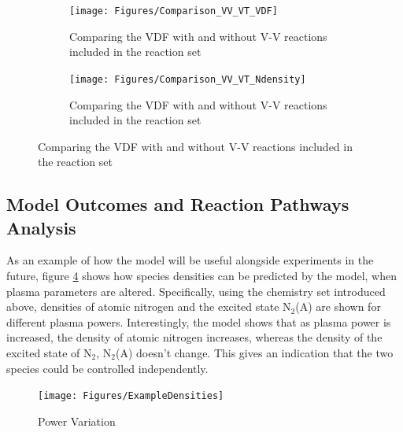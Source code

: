 \documentclass[11pt, oneside]{article}   	%
\begin{document}
\begin{figure}
\begin{subfigure}{0.5\textwidth}
\begin{center}
\texttt{[image: Figures/Comparison\_VV\_VT\_VDF]}
\caption{Comparing the VDF with and without V-V reactions included in the reaction set}
\label{fig:VDFComp}
\end{center}
\end{subfigure}
\begin{subfigure}{0.5\textwidth}
\begin{center}
\texttt{[image: Figures/Comparison\_VV\_VT\_Ndensity]}
\caption{Comparing the VDF with and without V-V reactions included in the reaction set}
\label{fig:NComp}
\end{center}
\end{subfigure}
\end{figure}


\subsection{Model Outcomes and Reaction Pathways Analysis}

As an example of how the model will be useful alongside experiments in the future, figure \ref{fig:ExamplePowerVar} shows how species densities can be predicted by the model, when plasma parameters are altered.
Specifically, using the chemistry set introduced above, densities of atomic nitrogen and the excited state N$_2$(A) are shown for different plasma powers.
Interestingly, the model shows that as plasma power is increased, the density of atomic nitrogen increases, whereas the density of the excited state of N$_2$, N$_2$(A) doesn't change.
This gives an indication that the two species could be controlled independently.

\begin{figure}
\texttt{[image: Figures/ExampleDensities]}
\label{fig:ExamplePowerVar}
\caption{Power Variation}
\end{figure}
\end{document}
